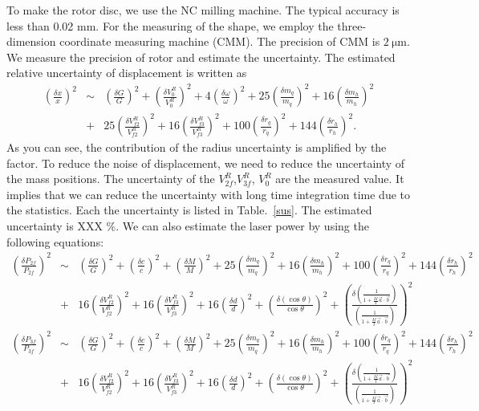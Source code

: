 \documentclass[A4]{spie}  %
\begin{document}
 To make the rotor disc, we use the NC milling machine. The typical accuracy is less than 0.02 mm. For the measuring of the shape, we employ the three-dimension coordinate measuring machine (CMM). The precision of CMM is $2~\mathrm{\mu m}$. We measure the precision of rotor and estimate the uncertainty. The estimated relative uncertainty of  displacement is written as
\begin{eqnarray}
\left( \frac{\delta x}{x} \right)^2 &\sim& \left( \frac{\delta G}{G} \right)^2 +\left( \frac{\delta V^R_0}{V^R_0} \right)^2+4\left( \frac{\delta \omega}{\omega} \right)^2+ 25\left( \frac{\delta m_q}{m_q} \right)^2 +16\left( \frac{\delta m_h}{m_h} \right)^2 \\
&+&25\left( \frac{\delta V^R_{f2}}{V^R_{f2}} \right)^2+16\left( \frac{\delta V^R_{f3}}{V^R_{f3}} \right)^2+ 100\left( \frac{\delta r_q}{r_q} \right)^2 +144\left( \frac{\delta r_h}{r_h} \right)^2.
\end{eqnarray}
As you can see, the contribution of the radius uncertainty is amplified by the factor. To reduce the noise of displacement, we need to reduce the uncertainty of the mass positions.
The uncertainty of the $V^R_{2f}$,$V^R_{3f}$, $V^R_{0}$ are the measured value. It implies that we can reduce the uncertainty with long time integration time due to the statistics. Each the uncertainty is listed in Table.~\ref{sus}. The estimated uncertainty is XXX \%.
We can also estimate the laser power by using the following equations:
\begin{eqnarray}
\left( \frac{\delta P_{2f}}{P_{2f}} \right)^2 &\sim& \left( \frac{\delta G}{G} \right)^2 +\left( \frac{\delta c}{c} \right)^2+ \left( \frac{\delta M}{M} \right)^2+25\left( \frac{\delta m_q}{m_q} \right)^2+16\left( \frac{\delta m_h}{m_h} \right)^2 +100\left( \frac{\delta r_q}{r_q} \right)^2+144\left( \frac{\delta r_h}{r_h} \right)^2 \\
&+&16\left( \frac{\delta V^R_{f2}}{V^R_{f2}} \right)^2+16\left( \frac{\delta V^R_{f3}}{V^R_{f3}} \right)^2+16\left( \frac{\delta d}{d} \right)^2+\left( \frac{\delta (\cos{\theta})}{\cos{\theta}} \right)^2+ \left( \frac{\delta\left( \frac{1}{1+\frac{M}{I}\vec{a}\cdot \vec{b}} \right)}{\left( \frac{1}{1+\frac{M}{I}\vec{a}\cdot \vec{b}} \right)} \right)^2 \\
\left( \frac{\delta P_{3f}}{P_{3f}} \right)^2 &\sim& \left( \frac{\delta G}{G} \right)^2 +\left( \frac{\delta c}{c} \right)^2+ \left( \frac{\delta M}{M} \right)^2+25\left( \frac{\delta m_q}{m_q} \right)^2+16\left( \frac{\delta m_h}{m_h} \right)^2 +100\left( \frac{\delta r_q}{r_q} \right)^2+144\left( \frac{\delta r_h}{r_h} \right)^2 \\
&+&16\left( \frac{\delta V^R_{f2}}{V^R_{f2}} \right)^2+16\left( \frac{\delta V^R_{f3}}{V^R_{f3}} \right)^2+16\left( \frac{\delta d}{d} \right)^2+\left( \frac{\delta (\cos{\theta})}{\cos{\theta}} \right)^2+ \left( \frac{\delta\left( \frac{1}{1+\frac{M}{I}\vec{a}\cdot \vec{b}} \right)}{\left( \frac{1}{1+\frac{M}{I}\vec{a}\cdot \vec{b}} \right)} \right)^2 \\
\end{eqnarray}
\end{document}
